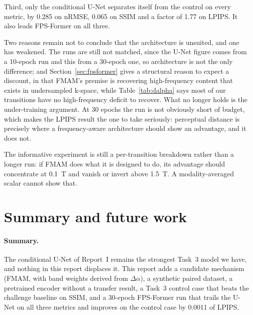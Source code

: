 \documentclass[11pt,a4paper]{article}
\newcommand{\rmse}{nRMSE}
\newcommand{\reportone}{Report~I}
\begin{document}
Third, only the conditional U-Net separates itself from the control on every metric, by \num{0.285} on
\rmse{}, \num{0.065} on SSIM and a factor of \num{1.77} on LPIPS. It also leads FPS-Former on all
three.

Two reasons remain not to conclude that the architecture is unsuited, and one has weakened. The runs are
still not matched, since the U-Net figure comes from a 10-epoch run and this from a 30-epoch one, so
architecture is not the only difference; and Section~\ref{sec:fpsformer} gives a structural reason to
expect a discount, in that FMAM's premise is recovering high-frequency content that exists in
undersampled k-space, while Table~\ref{tab:dalpha} says most of our transitions have no high-frequency
deficit to recover. What no longer holds is the under-training argument. At 30 epochs the run is not
obviously short of budget, which makes the LPIPS result the one to take seriously: perceptual distance
is precisely where a frequency-aware architecture should show an advantage, and it does not.

The informative experiment is still a per-transition breakdown rather than a longer run: if FMAM does
what it is designed to do, its advantage should concentrate at \SI{0.1}{\tesla} and vanish or invert
above \SI{1.5}{\tesla}. A modality-averaged scalar cannot show that.

\section{Summary and future work}
\label{sec:status}

\paragraph{Summary.} The conditional U-Net of \reportone{} remains the strongest Task~3
model we have, and nothing in this report displaces it. This report adds a candidate mechanism (FMAM,
with band weights derived from $\Delta\alpha$), a synthetic paired dataset, a pretrained encoder
without a transfer result, a Task~3 control case that beats the challenge baseline on SSIM, and a
30-epoch FPS-Former run that trails the U-Net on all three metrics and improves on the control case by
\num{0.0011} of LPIPS.
\end{document}
